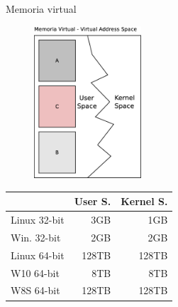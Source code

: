 \documentclass[envcountsect,dvips]{beamer}
\begin{document}
\begin{frame}{Memoria virtual}
\begin{minipage}{4.5cm}
\begin{figure}
\centering
\includegraphics[width=4cm]{images/memoriavirtual2.eps}
\label{fig:memoria}
\end{figure}
\end{minipage}
\begin{minipage}{6cm}



\begin{tabular}{ l || r | r }
  \hline			
  ~            & User S. & Kernel S. \\
  \hline			
  Linux 32-bit \cite{VIRTUAL}  & 3GB & 1GB \\
  Win. 32-bit                  & 2GB & 2GB \\
  \hline		
  Linux 64-bit \cite{linux64}  & 128TB & 128TB \\
  W10 64-bit                   &   8TB &   8TB \\  
  W8S 64-bit   \cite{win64}  & 128TB & 128TB \\  
  \hline  
\end{tabular}
\end{minipage}
\end{frame}
\end{document}
